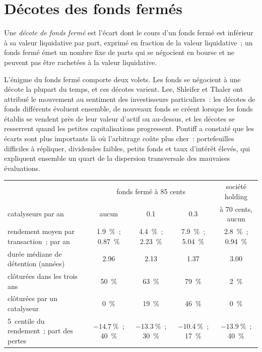 \section{Décotes des fonds fermés}

\begin{definition}\label{def:s1:share-classes-holding-companies-closed-end-funds-spacs:cef}
Une \emph{décote de fonds fermé} est l'écart dont le cours d'un fonds fermé est inférieur à sa valeur liquidative par part, exprimé en fraction de la
valeur liquidative~; un fonds fermé émet un nombre fixe de parts qui se négocient en bourse et ne peuvent pas être rachetées à la valeur liquidative.
\end{definition}

L'énigme du fonds fermé comporte deux volets. Les fonds se négocient à une décote la plupart du temps, et ces décotes varient. Lee, Shleifer et Thaler ont attribué le
mouvement au sentiment des investisseurs particuliers~: les décotes de fonds différents évoluent ensemble, de nouveaux fonds se créent lorsque les fonds établis se vendent près de leur valeur d'actif ou au-dessus,
et les décotes se resserrent quand les petites capitalisations progressent. Pontiff a constaté que les écarts sont plus importants là où l'arbitrage coûte plus cher~: portefeuilles difficiles à répliquer, dividendes
faibles, petits fonds et taux d'intérêt élevés, qui expliquent ensemble un quart de la dispersion transversale des mauvaises évaluations.

\begin{center}
\small
\setlength{\tabcolsep}{4pt}%
\begin{tabular}{@{}p{4.6cm}cccc@{}}
\toprule
& \multicolumn{3}{c}{fonds fermé à 85 cents} & société holding\\
catalyseurs par an & aucun & 0.1 & 0.3 & à 70 cents, aucun\\
\midrule
rendement moyen par transaction~; par an & 1.9~\%~; 0.87~\% & 4.4~\%~; 2.23~\% & 7.9~\%~; 5.04~\% & 2.8~\%~; 0.94~\%\\
durée médiane de détention (années) & 2.96 & 2.13 & 1.37 & 3.00\\
clôturées dans les trois ans & 50~\% & 63~\% & 79~\% & 2~\%\\
clôturées par un catalyseur & 0~\% & 19~\% & 46~\% & 0~\%\\
5\up{e}~centile du rendement~; part des pertes & $-14.7~\%$~; 40~\% & $-13.3~\%$~; 30~\% & $-10.4~\%$~; 17~\% & $-13.9~\%$~; 40~\%\\
\bottomrule
\end{tabular}
\end{center}

